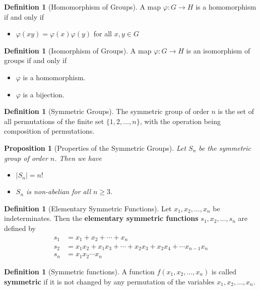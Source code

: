 \documentclass[10pt, oneside, reqno]{amsart}
\theoremstyle{plain}%
\newtheorem{prop}[thm]{Proposition}
\theoremstyle{definition}
\newtheorem{defn}[thm]{Definition}
\theoremstyle{remark}
\begin{document}
\begin{defn}[Homomorphism of Groups]
	A map $\varphi: G \rightarrow H$ is a homomorphism if and only if
	\begin{itemize}
		\item $\varphi(xy) = \varphi(x) \varphi(y)$ for all $x,y \in G$
	\end{itemize}
\end{defn}

\begin{defn}[Isomorphism of Groups]
	A map $\varphi: G \rightarrow H$ is an isomorphism of groups if and only if 
	\begin{itemize}
		\item $\varphi$ is a homomorphism.
		\item $\varphi$ is a bijection.
	\end{itemize}
\end{defn}

\begin{defn}[Symmetric Groups]
	The symmetric group of order $n$ is the set of all permutations of the finite set $\{1,2,\dots, n\}$, with the operation being composition of permutations.
\end{defn}

\begin{prop}[Properties of the Symmetric Groups]
	Let $S_n$ be the symmetric group of order $n$.  Then we have 
	\begin{itemize}
		\item  $| S_n | = n!$
		\item $S_n$ is non-abelian for all $n \geq 3$.
	\end{itemize}
	
\end{prop}

\begin{defn}[Elementary Symmetric Functions]
	Let $x_1, x_2, \dots, x_n$ be indeterminates.  Then the \textbf{elementary symmetric functions} $s_1, x_2, \dots, s_n$ are defined by \begin{align*}
		s_1 &= x_1 + x_2 + \cdots  + x_n\\
		s_2 &= x_1 x_2 + x_1 x_3 + \cdots + x_2 x_3 + x_2 x_4 + \cdots x_{n-1} x_n \\
		s_n &= x_1 x_2 \cdots x_n
	\end{align*}
\end{defn}

\begin{defn}[Symmetric functions]
A function $f(x_1, x_2, \dots, x_n)$ is called \textbf{symmetric} if it is not changed by any permutation of the variables $x_1, x_2, \dots, x_n$. 
\end{defn}
\end{document}

